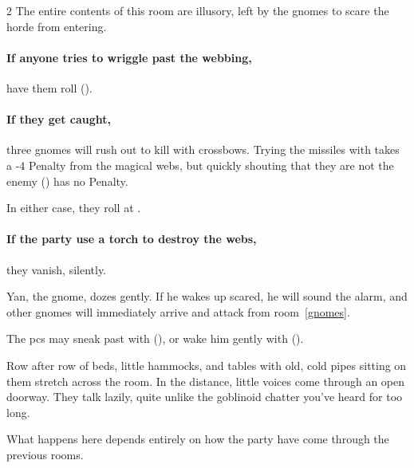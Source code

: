 \begin{multicols}{2}
The entire contents of this room are illusory, left by the gnomes to scare the horde from entering.

\paragraph{If anyone tries to wriggle past the webbing,}
have them roll  (\tn[12]).

\paragraph{If they get caught,}
three gnomes will rush out to kill with crossbows.
Trying the missiles with  takes a -4 Penalty from the magical webs, but quickly shouting that they are not the enemy ()  has no Penalty.

In either case, they roll at \tn[10].

\paragraph{If the party use a torch to destroy the webs,}
they vanish, silently.



Yan, the gnome, dozes gently.
If he wakes up scared, he will sound the alarm, and other gnomes will immediately arrive and attack from room~\ref{gnomes}.

The \glspl{pc} may sneak past with  (\tn[10]), or wake him gently with  (\tn[8]).


\begin{boxtext}
  Row after row of beds, little hammocks, and tables with old, cold pipes sitting on them stretch across the room.
  In the distance, little voices come through an open doorway.
  They talk lazily, quite unlike the goblinoid chatter you've heard for too long.
\end{boxtext}

What happens here depends entirely on how the party have come through the previous rooms.


\end{multicols}
